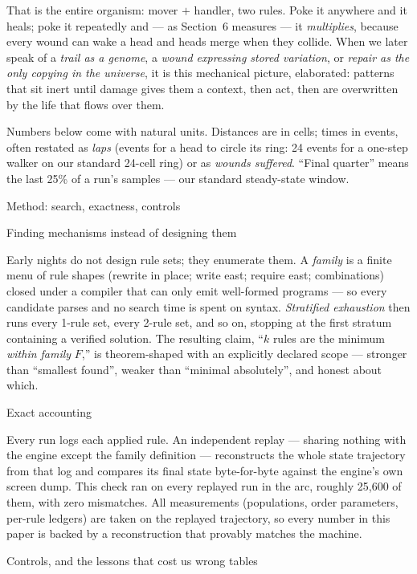 That is the entire organism: mover $+$ handler, two rules. Poke it
anywhere and it heals; poke it repeatedly and --- as Section~6
measures --- it {\it multiplies}, because every wound can wake a
head and heads merge when they collide. When we later speak of a
{\it trail as a genome}, a {\it wound expressing stored variation},
or {\it repair as the only copying in the universe}, it is this
mechanical picture, elaborated: patterns that sit inert until
damage gives them a context, then act, then are overwritten by the
life that flows over them.

Numbers below come with natural units. Distances are in cells;
times in events, often restated as {\it laps} (events for a head to
circle its ring: 24 events for a one-step walker on our standard
24-cell ring) or as {\it wounds suffered}. “Final quarter” means
the last 25\% of a run's samples --- our standard steady-state
window.

\sec Method: search, exactness, controls

\secc Finding mechanisms instead of designing them

Early nights do not design rule sets; they enumerate them. A {\it
family} is a finite menu of rule shapes (rewrite in place; write
east; require east; combinations) closed under a compiler that can
only emit well-formed programs --- so every candidate parses and no
search time is spent on syntax. {\it Stratified exhaustion} then
runs every 1-rule set, every 2-rule set, and so on, stopping at the
first stratum containing a verified solution. The resulting claim,
“$k$ rules are the minimum {\it within family} $F$,” is
theorem-shaped with an explicitly declared scope --- stronger than
“smallest found”, weaker than “minimal absolutely”, and honest
about which.

\secc Exact accounting

Every run logs each applied rule. An independent replay ---
sharing nothing with the engine except the family definition ---
reconstructs the whole state trajectory from that log and compares
its final state byte-for-byte against the engine's own screen
dump. This check ran on every replayed run in the arc, roughly
25{,}600 of them, with zero mismatches. All measurements
(populations, order parameters, per-rule ledgers) are taken on the
replayed trajectory, so every number in this paper is backed by a
reconstruction that provably matches the machine.

\secc Controls, and the lessons that cost us wrong tables

